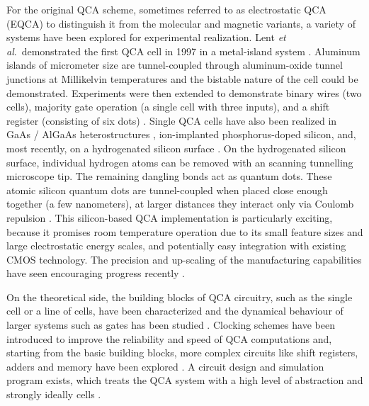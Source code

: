 For the original QCA scheme, sometimes referred to as electrostatic QCA (EQCA)
to distinguish it from the molecular and magnetic variants, a variety of systems
have been explored for experimental realization. Lent \emph{et al}.\
demonstrated the first QCA cell in 1997 in a metal-island system
\cite{orlov1997realization}. Aluminum islands of micrometer size are
tunnel-coupled through aluminum-oxide tunnel junctions at Millikelvin
temperatures and the bistable nature of the cell could be demonstrated.
Experiments were then extended to demonstrate binary wires (two cells), majority
gate operation (a single cell with three inputs), and a shift register
(consisting of six dots) \cite{orlov1999experimental} \cite{amlani1999digital}
\cite{kummamuru2003operation}. Single QCA cells have also been realized in GaAs
/ AlGaAs heterostructures , ion-implanted phosphorus-doped silicon, and, most
recently, on a hydrogenated silicon surface \cite{gardelis2003evidence}
\cite{mitic2006demonstration} \cite{haider2009controlled}. On the hydrogenated
silicon surface, individual hydrogen atoms can be removed with an scanning
tunnelling microscope tip. The remaining dangling bonds act as quantum dots.
These atomic silicon quantum dots are tunnel-coupled when placed close enough
together (a few nanometers), at larger distances they interact only via Coulomb
repulsion \cite{pitters2011tunnel}. This silicon-based QCA implementation is
particularly exciting, because it promises room temperature operation due to its
small feature sizes and large electrostatic energy scales, and potentially easy
integration with existing CMOS technology. The precision and up-scaling of the
manufacturing capabilities have seen encouraging progress recently
\cite{wolkow2013silicon}.


On the theoretical side, the building blocks of QCA circuitry, such as the
single cell or a line of cells, have been characterized and the dynamical
behaviour of larger systems such as gates has been studied \cite{lent1993lines}
\cite{tougaw1996dynamic}. Clocking schemes have been introduced to improve the
reliability and speed of QCA computations and, starting from the basic building
blocks, more complex circuits like shift registers, adders and memory have been
explored \cite{lent1997device} \cite{hennessy2001clocking}
\cite{rahimi2008quantum}. A circuit design and simulation program exists, which
treats the QCA system with a high level of abstraction and strongly ideally
cells \cite{walus2004qcadesigner}.

